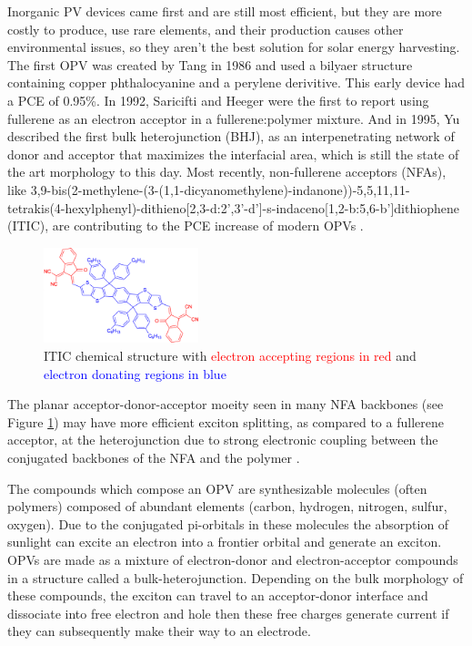 Inorganic PV devices came first and are still most efficient, but they are more costly to produce, use rare elements, and their production causes other environmental issues, so they aren't the best solution for solar energy harvesting. 
The first OPV was created by Tang in 1986 and \cite{Tang1986b} used a bilyaer structure containing copper phthalocyanine and a perylene derivitive. 
This early device had a PCE of 0.95\%.
In 1992, Saricifti and Heeger\cite{Saricifti1992} were the first to report using fullerene as an electron acceptor in a fullerene:polymer mixture.
And in 1995, Yu described the first bulk heterojunction (BHJ), as an interpenetrating network of donor and acceptor that maximizes the interfacial area, which is still the state of the art morphology to this day\cite{Yu1995}.
Most recently, non-fullerene acceptors (NFAs), like 3,9-bis(2-methylene-(3-(1,1-dicyanomethylene)-indanone))-5,5,11,11-tetrakis(4-hexylphenyl)-dithieno[2,3-d:2’,3’-d’]-s-indaceno[1,2-b:5,6-b’]dithiophene (ITIC), are contributing to the PCE increase of modern OPVs \cite{S.Gurney2019}.
\begin{figure}
    \centering
    \includegraphics[width=0.4\textwidth]{images/ITIC.pdf}
    \caption{ITIC chemical structure with \textcolor{red}{electron accepting regions in red} and \textcolor{blue}{electron donating regions in blue}}
    \label{fig:itic}
\end{figure}
The planar acceptor-donor-acceptor moeity seen in many NFA backbones (see Figure \ref{fig:itic}) may have more efficient exciton splitting, as compared to a fullerene acceptor, at the heterojunction due to strong electronic coupling between the conjugated backbones of the NFA and the polymer \cite{Yi2018}.

The compounds which compose an OPV are synthesizable molecules (often polymers) composed of abundant elements (carbon, hydrogen, nitrogen, sulfur, oxygen).
Due to the conjugated pi-orbitals in these molecules the absorption of sunlight can excite an electron into a frontier orbital and generate an exciton.
OPVs are made as a mixture of electron-donor and electron-acceptor compounds in a structure called a bulk-heterojunction.
Depending on the bulk morphology of these compounds, the exciton can travel to an acceptor-donor interface and dissociate into free electron and hole then these free charges generate current if they can subsequently make their way to an electrode.

